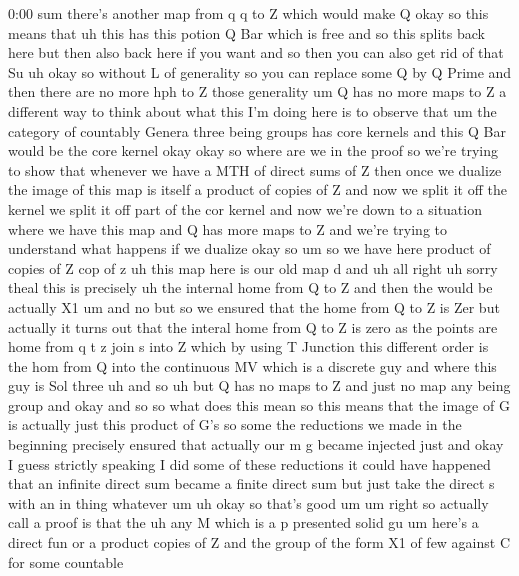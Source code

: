 \begin{unfinished}{0:00}
sum  there's  another  map  from  q  q  to  Z
which  would  make
Q  okay  so  this  means  that
uh  this  has  this  potion  Q  Bar  which  is
free  and  so  this  splits  back  here  but
then  also  back  here  if  you  want  and  so
then  you  can  also  get  rid  of  that
Su
uh  okay  so  without  L  of
generality  so  you  can  replace  some  Q  by
Q  Prime  and  then  there  are  no  more  hph
to  Z  those
generality
um  Q  has  no  more  maps  to
Z  a  different  way  to  think  about  what
this  I'm  doing  here  is  to  observe  that
um  the  category  of  countably  Genera
three  being  groups  has  core  kernels  and
this  Q  Bar  would  be  the  core
kernel
okay
okay  so  where  are  we  in  the  proof  so
we're  trying
to  show  that  whenever  we  have  a  MTH  of
direct  sums  of  Z  then  once  we
dualize  the  image  of  this  map  is  itself
a  product  of  copies  of
Z  and  now  we  split  it  off  the  kernel  we
split  it  off  part  of  the  cor  kernel  and
now  we're  down  to  a  situation  where  we
have  this  map  and  Q  has  more  maps  to  Z
and  we're  trying  to  understand  what
happens  if  we
dualize  okay
so
um  so  we  have  here  product  of  copies  of
Z  cop  of
z  uh  this  map  here  is  our  old
map  d
and
uh  all  right  uh  sorry  theal  this  is
precisely
uh  the  internal
home  from  Q  to
Z  and  then  the  would  be  actually
X1
um
and  no
but  so  we  ensured  that  the  home  from  Q
to  Z  is  Zer  but  actually  it  turns  out
that  the  interal  home  from  Q  to  Z  is
zero
as  the
points
are  home  from
q  t  z  join  s  into  Z  which  by  using  T
Junction  this  different  order  is  the  hom
from  Q  into  the  continuous
MV  which  is  a  discrete  guy  and  where
this  guy  is  Sol
three  uh  and
so  uh  but  Q  has  no  maps  to  Z  and  just  no
map  any  being  group
and  okay  and
so  so  what  does  this  mean  so  this  means
that  the  image  of  G  is  actually  just
this  product  of  G's  so  some  the
reductions  we  made  in  the  beginning
precisely  ensured  that  actually  our  m  g
became  injected
just
and  okay  I  guess  strictly  speaking  I  did
some  of  these  reductions  it  could  have
happened  that  an  infinite  direct  sum
became  a  finite  direct  sum
but
just  take  the  direct  s  with  an  in  thing
whatever
um  uh
okay  so  that's
good
um
um  right  so  actually  call  a
proof  is  that
the
uh  any  M  which  is
a  p  presented  solid  gu
um  here's  a  direct  fun  or  a
product  copies  of
Z  and  the  group  of  the  form
X1  of  few  against  C  for  some  countable

\end{unfinished}
